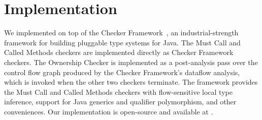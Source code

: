 \section{Implementation}
\label{sec:implementation}

We implemented \Tool on top of the Checker Framework~\cite{PapiACPE2008},
an industrial-strength framework for building pluggable type systems
for Java. The Must Call and Called Methods checkers are implemented
directly as Checker Framework checkers.  The Ownership Checker is
implemented as a post-analysis pass over the control flow graph
produced by the Checker Framework's dataflow analysis, which is invoked
when the other two checkers terminate. The framework provides the
Must Call and Called Methods checkers with flow-sensitive local type
inference, support for Java generics and qualifier polymorphism, and
other conveniences. Our implementation is open-source and available
at .
